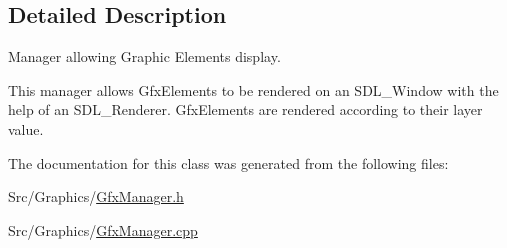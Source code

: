 \subsection{Detailed Description}
Manager allowing Graphic Elements display. 

This manager allows Gfx\-Elements to be rendered on an S\-D\-L\-\_\-\-Window with the help of an S\-D\-L\-\_\-\-Renderer. Gfx\-Elements are rendered according to their layer value. 

The documentation for this class was generated from the following files\-:\begin{DoxyCompactItemize}
\item 
Src/\-Graphics/\hyperlink{GfxManager_8h}{Gfx\-Manager.\-h}\item 
Src/\-Graphics/\hyperlink{GfxManager_8cpp}{Gfx\-Manager.\-cpp}\end{DoxyCompactItemize}
